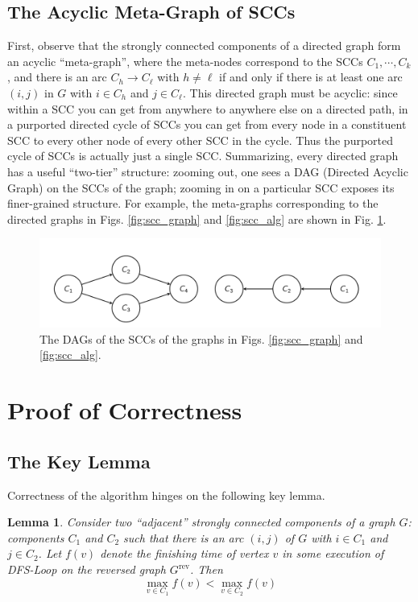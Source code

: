 \documentclass [12pt]{article}
\newtheorem{lemma}[theorem]{Lemma}
\theoremstyle{definition}
\begin{document}
\subsection{The Acyclic Meta-Graph of SCCs} 
First, observe that the strongly connected components of a directed graph form an acyclic ``meta-graph'', where the meta-nodes correspond to the SCCs $C_1, \cdots , C_k$ , and there is an arc $C_h \to C_{\ell}$ with $h \neq \ell$ if and only if there is at least one arc $(i, j)$ in $G$ with $i \in C_h$ and $j \in C_{\ell}$. This directed graph must be acyclic: since within a SCC you can get from anywhere to anywhere else on a directed path, in a purported directed cycle of SCCs you can get from every node in a constituent SCC to every other node of every other SCC in the cycle. Thus the purported cycle of SCCs is actually just a single SCC. Summarizing, every directed graph has a useful ``two-tier'' structure: zooming out, one sees a DAG (Directed Acyclic Graph) on the SCCs of the graph; zooming in on a particular SCC exposes its finer-grained structure. For example, the meta-graphs corresponding to the directed graphs in Figs. \ref{fig:scc_graph} and \ref{fig:scc_alg} are shown in Fig. \ref{fig:meta_graph_scc}.

\begin{figure}
\includegraphics[scale=0.8]{meta_graph_scc.png}
\caption{The DAGs of the SCCs of the graphs in Figs. \ref{fig:scc_graph} and \ref{fig:scc_alg}.}
\label{fig:meta_graph_scc}
\end{figure}

\section{Proof of Correctness}
\subsection{The Key Lemma}
Correctness of the algorithm hinges on the following key lemma.

\begin{lemma} 
Consider two ``adjacent'' strongly connected components of a graph $G$: components $C_1$ and $C_2$ such that there is an arc $(i, j)$ of $G$ with $i \in C_1$ and $j \in C_2$. Let $ f (v )$ denote the finishing time of vertex $v$ in some execution of DFS-Loop on the reversed graph $G^{\text{rev}}$. Then
$$
\max_{v\in C_1} f(v) < \max_{v\in C_2}f(v)
$$
\end{lemma}
\end{document}
